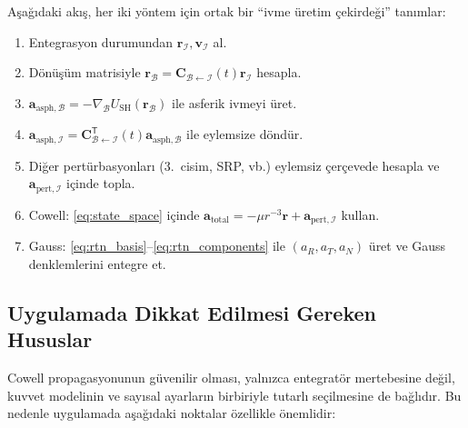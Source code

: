 Aşağıdaki akış, her iki yöntem için ortak bir ``ivme üretim çekirdeği'' tanımlar:
\begin{enumerate}
\item Entegrasyon durumundan $\mathbf r_{\mathcal I},\mathbf v_{\mathcal I}$ al.
\item Dönüşüm matrisiyle $\mathbf r_{\mathcal B}=\mathbf C_{\mathcal B\leftarrow\mathcal I}(t)\mathbf r_{\mathcal I}$ hesapla.
\item $\mathbf a_{\text{asph},\mathcal B}=-\nabla_{\mathcal B}U_{\text{SH}}(\mathbf r_{\mathcal B})$ ile asferik ivmeyi üret.
\item $\mathbf a_{\text{asph},\mathcal I}=\mathbf C_{\mathcal B\leftarrow\mathcal I}^{\mathsf T}(t)\mathbf a_{\text{asph},\mathcal B}$ ile eylemsize döndür.
\item Diğer pertürbasyonları (3.\ cisim, SRP, vb.) eylemsiz çerçevede hesapla ve $\mathbf a_{\text{pert},\mathcal I}$ içinde topla.
\item Cowell: \eqref{eq:state_space} içinde $\mathbf a_{\text{total}}=-\mu r^{-3}\mathbf r + \mathbf a_{\text{pert},\mathcal I}$ kullan.
\item Gauss: \eqref{eq:rtn_basis}--\eqref{eq:rtn_components} ile $(a_R,a_T,a_N)$ üret ve Gauss denklemlerini entegre et.
\end{enumerate}

\subsection{Uygulamada Dikkat Edilmesi Gereken Hususlar}
\label{subsec:cowell_practical}

Cowell propagasyonunun güvenilir olması, yalnızca entegratör mertebesine değil, kuvvet modelinin ve sayısal ayarların
birbiriyle tutarlı seçilmesine de bağlıdır. Bu nedenle uygulamada aşağıdaki noktalar özellikle önemlidir:

